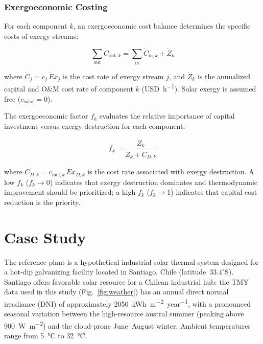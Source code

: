 \documentclass[11pt,review,3p]{elsarticle}
\begin{document}
\subsubsection{Exergoeconomic Costing}
\label{sec:exergoecon}

For each component $k$, an exergoeconomic cost balance determines the specific costs of exergy streams:

\begin{equation}
    \sum_{\text{out}} \dot{C}_{\text{out},k} = \sum_{\text{in}} \dot{C}_{\text{in},k} + \dot{Z}_k
    \label{eq:cost_balance}
\end{equation}

where $\dot{C}_j = c_j\,\dot{E}x_j$ is the cost rate of exergy stream $j$, and $\dot{Z}_k$ is the annualized capital and O\&M cost rate of component $k$ (\si{USD.h^{-1}}). Solar exergy is assumed free ($c_{\text{solar}} = 0$).

The exergoeconomic factor $f_k$ evaluates the relative importance of capital investment versus exergy destruction for each component:

\begin{equation}
    f_k = \frac{\dot{Z}_k}{\dot{Z}_k + \dot{C}_{D,k}}
    \label{eq:f_factor}
\end{equation}

where $\dot{C}_{D,k} = c_{\text{fuel},k}\,\dot{E}x_{D,k}$ is the cost rate associated with exergy destruction. A low $f_k$ ($f_k \to 0$) indicates that exergy destruction dominates and thermodynamic improvement should be prioritized; a high $f_k$ ($f_k \to 1$) indicates that capital cost reduction is the priority.

\section{Case Study}
\label{sec:case_study}

The reference plant is a hypothetical industrial solar thermal system designed for a hot-dip galvanizing facility located in Santiago, Chile (latitude~$33.4^\circ$S). Santiago offers favorable solar resource for a Chilean industrial hub: the TMY data used in this study (Fig.~\ref{fig:weather}) has an annual direct normal irradiance (DNI) of approximately \SI{2050}{kWh.m^{-2}.year^{-1}}, with a pronounced seasonal variation between the high-resource austral summer (peaking above \SI{900}{W.m^{-2}}) and the cloud-prone June--August winter. Ambient temperatures range from \SI{5}{\celsius} to \SI{32}{\celsius}.
\end{document}
